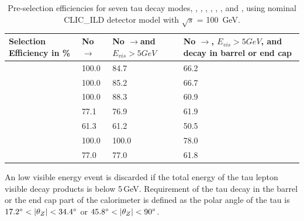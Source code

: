 \documentclass[a4paper,11pt]{article}
\newcommand{\decayElectron}{\Pem\PAGne\PGnGt}
\newcommand{\decayMuon}{\PGmm\PAGnGm\PGnGt}
\newcommand{\decayPion}{\PGpm\PGnGt}
\newcommand{\decayRho}{\PGrP{\PGpm\PGpz}\PGnGt}
\newcommand{\decayAiPhoton}{\PaDoP{\PGpm\PGpz\PGpz}\PGnGt}
\newcommand{\decayAiPion}{\PaDoP{\PGpm\PGpm\PGpp}\PGnGt}
\newcommand{\decayThreePionPhoton}{\PGpm\PGpm\PGpp\PGpz\PGnGt}
\newcommand{\decayElectronShort}{\Pem\PAGne}
\newcommand{\decayMuonShort}{\PGmm\PAGnGm}
\newcommand{\decayPionShort}{\PGpm}
\newcommand{\decayRhoShort}{\PGrP{\PGpm\PGpz}}
\newcommand{\decayAiPhotonShort}{\PaDoP{\PGpm\PGpz\PGpz}}
\newcommand{\decayAiPionShort}{\PaDoP{\PGpm\PGpm\PGpp}}
\newcommand{\decayThreePionPhotonShort}{\PGpm\PGpm\PGpp\PGpz}
\newcommand{\photonToee}{\PGg$\to$\Pep\Pem}
\newcommand{\rootS}{\ensuremath{\sqrt{s}} }
\begin{document}
\begin{table}[htbp]
\centering

\smallskip
\small
\begin{tabular}{| l |p{25mm} | p{25mm} | p{35mm} |}
\hline
  Selection Efficiency in \%  & No \photonToee & No \photonToee and $E_{vis}>5GeV$ & No \photonToee, $E_{vis}>5GeV$, and decay in barrel or end cap \\
\hline

\textbf{\decayElectronShort}& 100.0 & 84.7& 66.2\\
\textbf{\decayMuonShort}&100.0& 85.2&66.7\\
\textbf{\decayPionShort}&100.0& 88.3&60.9\\
\textbf{\decayRhoShort}&77.1&76.9&61.9\\
\textbf{\decayAiPhotonShort}&61.3&61.2&50.5\\
\textbf{\decayAiPionShort}&100.0&100.0&78.0\\
\textbf{\decayThreePionPhotonShort}&77.0&77.0&61.8\\

\hline
\end{tabular}
\caption{\label{tab:preselection} Pre-selection efficiencies for seven tau decay modes, \decayElectron, \decayMuon, \decayPion, \decayRho, \decayAiPhoton, \decayAiPion, and \decayThreePionPhoton,  using nominal CLIC\_ILD detector model with \rootS = 100 \,GeV.}
\end{table}

An low visible energy event is discarded if the total energy of the tau lepton visible decay products is below 5\,GeV. Requirement of the tau decay in the barrel or the end cap part of the calorimeter is defined as the polar angle of the tau is $ 17.2\degree < |\theta_{Z}| < 34.4\degree$ or $ 45.8\degree < |\theta_{Z}| < 90\degree$.




\end{document}

